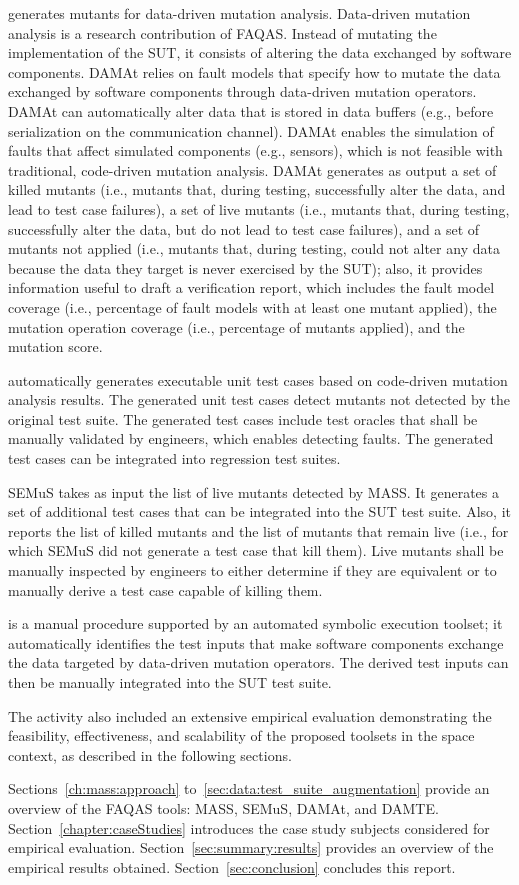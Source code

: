  generates mutants for data-driven mutation analysis. Data-driven mutation analysis is a research contribution of FAQAS. Instead of mutating the implementation of the SUT, it consists of altering the data exchanged by software components.
DAMAt relies on fault models that specify how to mutate the data exchanged by software components through data-driven mutation operators. DAMAt can automatically alter data that is stored in data buffers (e.g., before serialization on the communication channel).
DAMAt enables the simulation of faults that affect simulated components (e.g., sensors), which is not feasible with traditional, code-driven mutation analysis.
DAMAt generates as output a set of killed mutants (i.e., mutants that, during testing, successfully alter the data, and lead to test case failures), a set of live mutants (i.e., mutants that, during testing, successfully alter the data, but do not lead to test case failures), and a set of mutants not applied (i.e., mutants that, during testing, could not alter any data because the data they target is never exercised by the SUT); also, it provides information useful to draft a verification report, which includes the fault model coverage (i.e., percentage of fault models with at least one mutant applied), the mutation operation coverage (i.e., percentage of mutants applied), and the mutation score.

 automatically generates executable unit test cases based on code-driven mutation analysis results. The generated unit test cases detect mutants not detected by the original test suite. The generated test cases include test oracles that shall be manually validated by engineers, which enables detecting faults. The generated test cases can be integrated into regression test suites.

SEMuS takes as input the list of live mutants detected by MASS. It generates a set of additional test cases that can be integrated into the SUT test suite. Also, it reports the list of killed mutants and the list of mutants that remain live (i.e., for which SEMuS did not generate a test case that kill them). Live mutants shall be manually inspected by engineers to either determine if they are equivalent or to manually derive a test case capable of killing them.

 is a manual procedure supported by an automated symbolic execution toolset; it automatically identifies the test inputs that make software components exchange the data targeted by data-driven mutation operators. The derived test inputs can then be manually integrated into the SUT test suite.

The activity also included an extensive empirical evaluation demonstrating the feasibility, effectiveness, and scalability of the proposed toolsets in the space context, as described in the following sections.

Sections~\ref{ch:mass:approach} to~\ref{sec:data:test_suite_augmentation} provide an overview of the FAQAS tools: MASS, SEMuS, DAMAt, and DAMTE.
Section~\ref{chapter:caseStudies} introduces the case study subjects considered for empirical evaluation.
Section~\ref{sec:summary:results} provides an overview of the empirical results obtained.
Section~\ref{sec:conclusion} concludes this report.

